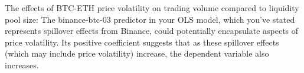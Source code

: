 \documentclass{article}
\begin{document}
The effects of BTC-ETH price volatility on trading volume compared to liquidity pool size: The binance-btc-03 predictor in your OLS model, which you've stated represents spillover effects from Binance, could potentially encapsulate aspects of price volatility. Its positive coefficient suggests that as these spillover effects (which may include price volatility) increase, the dependent variable also increases.






%
\end{document}
